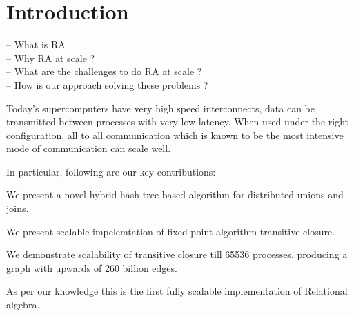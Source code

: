 

\section{Introduction}
\label{sec:intro}
%


-- What is RA \\
-- Why RA at scale ? \\
-- What are the challenges to do RA at scale ? \\
-- How is our approach solving these problems ?

Today's supercomputers have very high speed interconnects, data can be transmitted between processes with very low latency. 
When used under the right configuration, all to all communication which is known to be the most intensive mode of communication can scale well.


In particular, following are our key contributions:
\begin{tightenumerate}
	\item We present a novel hybrid hash-tree based algorithm for distributed unions and joins.
	\item We present scalable impelemtation of fixed point algorithm transitive closure.
	\item We demonstrate scalability of transitive closure till 65536 processes, producing a graph with upwards of 260 billion edges. 
\end{tightenumerate}

As per our knowledge this is the first fully scalable implementation of Relational algebra.


